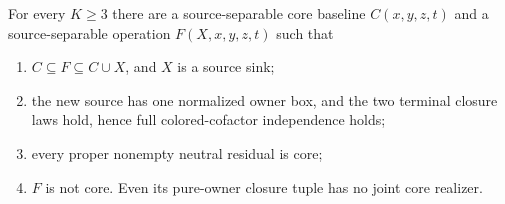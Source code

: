 \begin{theorem}
\label{core:thm:terminal-separable-obstruction}
For every $K\geq3$ there are a source-separable core baseline
$C(x,y,z,t)$ and a source-separable operation $F(X,x,y,z,t)$ such that
\begin{enumerate}
\item $C\subseteq F\subseteq C\cup X$, and $X$ is a source sink;
\item the new source has one normalized owner box, and the two terminal
  closure laws hold, hence full colored-cofactor independence holds;
\item every proper nonempty neutral residual is core;
\item $F$ is not core. Even its pure-owner closure tuple has no joint
  core realizer.
\end{enumerate}
\end{theorem}
